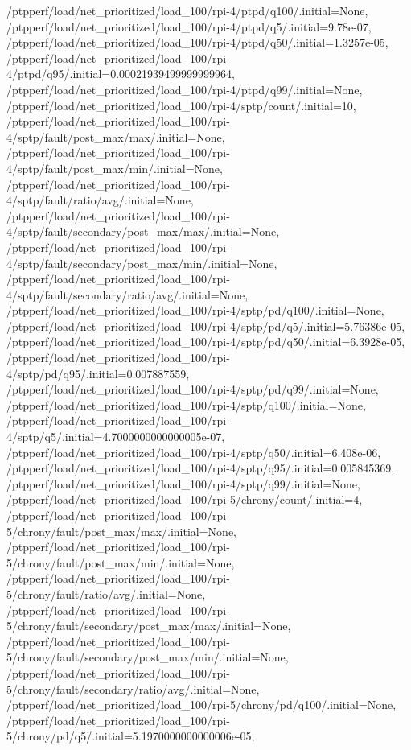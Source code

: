 {    /ptpperf/load/net_prioritized/load_100/rpi-4/ptpd/q100/.initial=None,
    /ptpperf/load/net_prioritized/load_100/rpi-4/ptpd/q5/.initial=9.78e-07,
    /ptpperf/load/net_prioritized/load_100/rpi-4/ptpd/q50/.initial=1.3257e-05,
    /ptpperf/load/net_prioritized/load_100/rpi-4/ptpd/q95/.initial=0.00021939499999999964,
    /ptpperf/load/net_prioritized/load_100/rpi-4/ptpd/q99/.initial=None,
    /ptpperf/load/net_prioritized/load_100/rpi-4/sptp/count/.initial=10,
    /ptpperf/load/net_prioritized/load_100/rpi-4/sptp/fault/post_max/max/.initial=None,
    /ptpperf/load/net_prioritized/load_100/rpi-4/sptp/fault/post_max/min/.initial=None,
    /ptpperf/load/net_prioritized/load_100/rpi-4/sptp/fault/ratio/avg/.initial=None,
    /ptpperf/load/net_prioritized/load_100/rpi-4/sptp/fault/secondary/post_max/max/.initial=None,
    /ptpperf/load/net_prioritized/load_100/rpi-4/sptp/fault/secondary/post_max/min/.initial=None,
    /ptpperf/load/net_prioritized/load_100/rpi-4/sptp/fault/secondary/ratio/avg/.initial=None,
    /ptpperf/load/net_prioritized/load_100/rpi-4/sptp/pd/q100/.initial=None,
    /ptpperf/load/net_prioritized/load_100/rpi-4/sptp/pd/q5/.initial=5.76386e-05,
    /ptpperf/load/net_prioritized/load_100/rpi-4/sptp/pd/q50/.initial=6.3928e-05,
    /ptpperf/load/net_prioritized/load_100/rpi-4/sptp/pd/q95/.initial=0.007887559,
    /ptpperf/load/net_prioritized/load_100/rpi-4/sptp/pd/q99/.initial=None,
    /ptpperf/load/net_prioritized/load_100/rpi-4/sptp/q100/.initial=None,
    /ptpperf/load/net_prioritized/load_100/rpi-4/sptp/q5/.initial=4.7000000000000005e-07,
    /ptpperf/load/net_prioritized/load_100/rpi-4/sptp/q50/.initial=6.408e-06,
    /ptpperf/load/net_prioritized/load_100/rpi-4/sptp/q95/.initial=0.005845369,
    /ptpperf/load/net_prioritized/load_100/rpi-4/sptp/q99/.initial=None,
    /ptpperf/load/net_prioritized/load_100/rpi-5/chrony/count/.initial=4,
    /ptpperf/load/net_prioritized/load_100/rpi-5/chrony/fault/post_max/max/.initial=None,
    /ptpperf/load/net_prioritized/load_100/rpi-5/chrony/fault/post_max/min/.initial=None,
    /ptpperf/load/net_prioritized/load_100/rpi-5/chrony/fault/ratio/avg/.initial=None,
    /ptpperf/load/net_prioritized/load_100/rpi-5/chrony/fault/secondary/post_max/max/.initial=None,
    /ptpperf/load/net_prioritized/load_100/rpi-5/chrony/fault/secondary/post_max/min/.initial=None,
    /ptpperf/load/net_prioritized/load_100/rpi-5/chrony/fault/secondary/ratio/avg/.initial=None,
    /ptpperf/load/net_prioritized/load_100/rpi-5/chrony/pd/q100/.initial=None,
    /ptpperf/load/net_prioritized/load_100/rpi-5/chrony/pd/q5/.initial=5.1970000000000006e-05,
}
